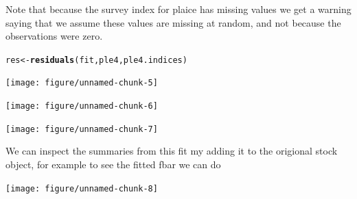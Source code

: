 \documentclass[a4paper,english,10pt]{article}\usepackage[]{graphicx}\usepackage[]{color}
\makeatletter
\newcommand{\hlstd}[1]{\textcolor[rgb]{0.345,0.345,0.345}{#1}}%
\newcommand{\hlkwb}[1]{\textcolor[rgb]{0.69,0.353,0.396}{#1}}%
\newcommand{\hlkwd}[1]{\textcolor[rgb]{0.737,0.353,0.396}{\textbf{#1}}}%
\newenvironment{kframe}{%
 \def\at@end@of@kframe{}%
 \ifinner\ifhmode%
  \def\at@end@of@kframe{\end{minipage}}%
  \begin{minipage}{\columnwidth}%
 \fi\fi%
 \def\FrameCommand##1{\hskip\@totalleftmargin \hskip-\fboxsep
 \colorbox{shadecolor}{##1}\hskip-\fboxsep
     \hskip-\linewidth \hskip-\@totalleftmargin \hskip\columnwidth}%
 \MakeFramed {\advance\hsize-\width
   \@totalleftmargin\z@ \linewidth\hsize
   \@setminipage}}%
 {\par\unskip\endMakeFramed%
 \at@end@of@kframe}
\newenvironment{knitrout}{}{} %
\makeatother
\begin{document}
Note that because the survey index for plaice has missing values we get a warning saying that we assume these values are missing at random, and not because the observations were zero.

\begin{knitrout}
\color{fgcolor}\begin{kframe}
\begin{alltt}
\hlstd{res} \hlkwb{<-} \hlkwd{residuals}\hlstd{(fit, ple4, ple4.indices)}
\end{alltt}
\end{kframe}
\end{knitrout}


\begin{knitrout}
\color{fgcolor}

{\centering \texttt{[image: figure/unnamed-chunk-5]} 

}



\end{knitrout}


\begin{knitrout}
\color{fgcolor}

{\centering \texttt{[image: figure/unnamed-chunk-6]} 

}



\end{knitrout}


\begin{knitrout}
\color{fgcolor}

{\centering \texttt{[image: figure/unnamed-chunk-7]} 

}



\end{knitrout}


We can inspect the summaries from this fit my adding it to the origional stock object, for example to see the fitted fbar we can do

\begin{knitrout}
\color{fgcolor}

{\centering \texttt{[image: figure/unnamed-chunk-8]} 

}



\end{knitrout}
\end{document}
